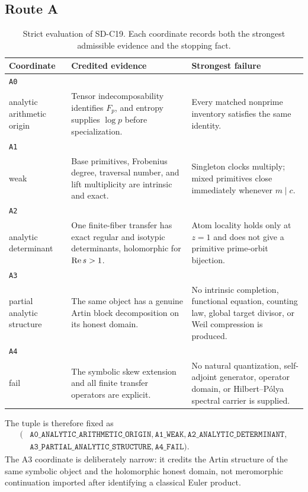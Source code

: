 \subsection{Route A}

\begin{table}[t]
\centering
\caption{Strict evaluation of SD-C19.  Each coordinate records both the
strongest admissible evidence and the stopping fact.}
\label{tab:route}
\small
\begin{tabularx}{\textwidth}{L{0.13\textwidth}
  >{\raggedright\arraybackslash}X
  >{\raggedright\arraybackslash}X}
\toprule
Coordinate & Credited evidence & Strongest failure \\
\midrule
\texttt{A0}\\ analytic arithmetic origin
& Tensor indecomposability identifies \(F_p\), and entropy supplies \(\log p\)
before specialization.
& Every matched nonprime inventory satisfies the same identity. \\
\texttt{A1}\\ weak
& Base primitives, Frobenius degree, traversal number, and lift multiplicity
are intrinsic and exact.
& Singleton clocks multiply; mixed primitives close immediately whenever
\(m\mid c\). \\
\texttt{A2}\\ analytic determinant
& One finite-fiber transfer has exact regular and isotypic determinants,
holomorphic for \(\operatorname{Re} s>1\).
& Atom locality holds only at \(z=1\) and does not give a primitive
prime-orbit bijection. \\
\texttt{A3}\\ partial analytic structure
& The same object has a genuine Artin block decomposition on its honest
domain.
& No intrinsic completion, functional equation, counting law, global target
divisor, or Weil compression is produced. \\
\texttt{A4}\\ fail
& The symbolic skew extension and all finite transfer operators are explicit.
& No natural quantization, self-adjoint generator, operator domain, or
Hilbert--Pólya spectral carrier is supplied. \\
\bottomrule
\end{tabularx}
\end{table}

The tuple is therefore fixed as
\[
\boxed{
\begin{aligned}
(&\texttt{A0\_ANALYTIC\_ARITHMETIC\_ORIGIN},
\texttt{A1\_WEAK},
\texttt{A2\_ANALYTIC\_DETERMINANT},\\[-1pt]
&\texttt{A3\_PARTIAL\_ANALYTIC\_STRUCTURE},
\texttt{A4\_FAIL}).
\end{aligned}}
\tag{8.4}\label{8.4}
\]
The A3 coordinate is deliberately narrow: it credits the Artin structure of
the same symbolic object and the holomorphic honest domain, not meromorphic
continuation imported after identifying a classical Euler product.

